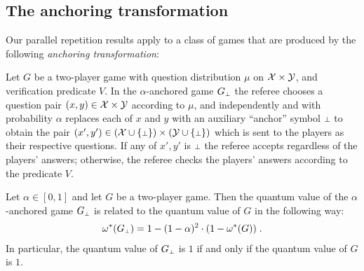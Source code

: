 \subsection{The anchoring transformation} 
Our parallel repetition results apply to a class of games that are produced by the following \emph{anchoring transformation}:
\begin{definition} \label{def:anchor_basic} 
Let $G$ be a two-player game with question distribution $\mu$ on $\mathcal{X}\times \mathcal{Y}$, and verification predicate $V$. In the $\alpha$-anchored game $G_{\dummy}$  the referee chooses a question pair $(x,y)\in \mathcal{X}\times \mathcal{Y}$ according to $\mu$, and independently and with probability $\alpha$ replaces each of $x$ and $y$ with an auxiliary ``anchor'' symbol $\dummy$ to obtain the pair $(x', y')\in (\X\cup \{\dummy \}) \times (\Y\cup \{\dummy \})$ which is sent to the players as their respective questions. If any of $x',y'$ is $\dummy$ the referee accepts regardless of the players' answers; otherwise, the referee checks the players' answers according to the predicate $V$.
\end{definition}

\begin{lemma}
Let $\alpha \in [0,1]$ and let $G$ be a two-player game. Then the quantum value of the $\alpha$-anchored game $G_\dummy$ is related to the quantum value of $G$ in the following way:
\begin{gather*}
	\omega^*(G_\dummy) = 1 - (1 - \alpha)^2 \cdot (1 - \omega^*(G))\;.
\end{gather*}
In particular, the quantum value of $G_\dummy$ is $1$ if and only if the quantum value of $G$ is $1$.
\end{lemma}

